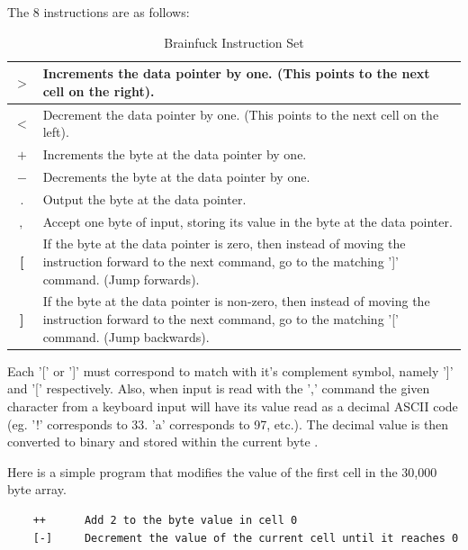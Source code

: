 The 8 instructions are as follows:
\begin{table}[h!tb]
    \centering
    \begin{tabular}{|c|p{10cm}|}
        \hline
        \textbf{$>$} & Increments the data pointer by one. (This points to the next cell on the right). \\
        \hline
        \textbf{$<$} & Decrement the data pointer by one. (This points to the next cell on the left). \\
        \hline
        \textbf{$+$} & Increments the byte at the data pointer by one. \\
        \hline
        \textbf{$-$} & Decrements the byte at the data pointer by one. \\
        \hline
        \textbf{$.$} & Output the byte at the data pointer. \\
        \hline
        \textbf{$,$} & Accept one byte of input, storing its value in the byte at the data pointer.\\
        \hline
        \textbf{[} & If the byte at the data pointer is zero, then instead of moving the instruction forward to the next command, go to the matching ']' command. (Jump forwards). \\
        \hline
        \textbf{]} & If the byte at the data pointer is non-zero, then instead of moving the instruction forward to the next command, go to the matching '[' command. (Jump backwards). \\
        \hline
    \end{tabular}
    \caption{Brainfuck Instruction Set}
    \label{tab:BrainfuckInstructionSet}
\end{table}

Each '[' or ']' must correspond to match with it's complement symbol, namely ']' and '[' respectively.
Also, when input is read with the ',' command the given character from a keyboard input will have its value read as a decimal ASCII code
(eg. '!' corresponds to 33. 'a' corresponds to 97, etc.).
The decimal value is then converted to binary and stored within the current byte \cite{BfSO}.

Here is a simple program that modifies the value of the first cell in the 30,000 byte array.

\begin{verbatim}
    ++      Add 2 to the byte value in cell 0
    [-]     Decrement the value of the current cell until it reaches 0
\end{verbatim}

